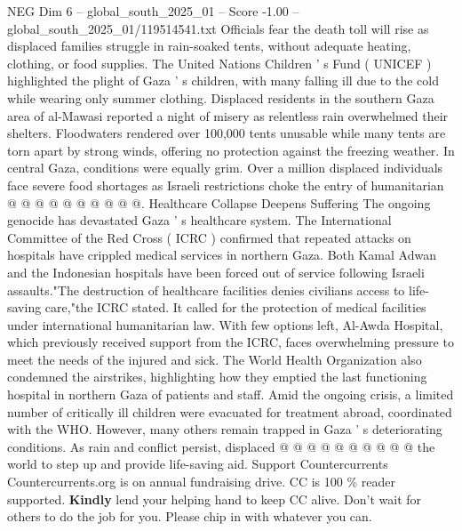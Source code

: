 \begin{textsample}{NEG Dim 6 – global\_south\_2025\_01 – Score -1.00 – global\_south\_2025\_01/119514541.txt}
Officials fear the death toll will rise as displaced families struggle in rain-soaked tents, without adequate heating, clothing, or food supplies.
The United Nations Children ' s Fund ( UNICEF ) highlighted the plight of Gaza ' s children, with many falling ill due to the cold while wearing only summer clothing.
Displaced residents in the southern Gaza area of al-Mawasi reported a night of misery as relentless rain overwhelmed their shelters.
Floodwaters rendered over 100,000 tents unusable while many tents are torn apart by strong winds, offering no protection against the freezing weather.
In central Gaza, conditions were equally grim.
Over a million displaced individuals face severe food shortages as Israeli restrictions choke the entry of humanitarian @ @ @ @ @ @ @ @ @ @.
Healthcare Collapse Deepens Suffering The ongoing genocide has devastated Gaza ' s healthcare system.
The International Committee of the Red Cross ( ICRC ) confirmed that repeated attacks on hospitals have crippled medical services in northern Gaza.
Both Kamal Adwan and the Indonesian hospitals have been forced out of service following Israeli assaults."The destruction of healthcare facilities denies civilians access to life-saving care,"the ICRC stated.
It called for the protection of medical facilities under international humanitarian law.
With few options left, Al-Awda Hospital, which previously received support from the ICRC, faces overwhelming pressure to meet the needs of the injured and sick.
The World Health Organization also condemned the airstrikes, highlighting how they emptied the last functioning hospital in northern Gaza of patients and staff.
Amid the ongoing crisis, a limited number of critically ill children were evacuated for treatment abroad, coordinated with the WHO.
However, many others remain trapped in Gaza ' s deteriorating conditions.
As rain and conflict persist, displaced @ @ @ @ @ @ @ @ @ @ the world to step up and provide life-saving aid.
Support Countercurrents Countercurrents.org is on annual fundraising drive.
CC is 100 \% reader supported. \textbf{Kindly} lend your helping hand to keep CC alive.
Don't wait for others to do the job for you.
Please chip in with whatever you can.

\end{textsample}

